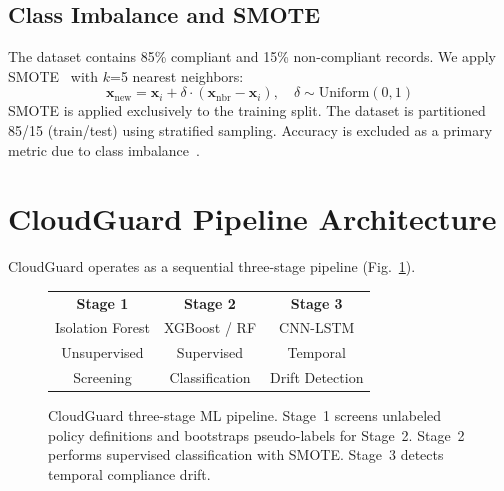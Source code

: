 \documentclass[conference]{IEEEtran}
\begin{document}
\subsection{Class Imbalance and SMOTE}
The dataset contains 85\% compliant and 15\% non-compliant records. 
We apply SMOTE~\cite{chawla2002} with $k$=5 nearest neighbors:
\begin{equation}
  \mathbf{x}_{\text{new}} = \mathbf{x}_i + 
  \delta \cdot (\mathbf{x}_{\text{nbr}} - \mathbf{x}_i), 
  \quad \delta \sim \text{Uniform}(0,1)
\end{equation}
SMOTE is applied exclusively to the training split. The dataset is 
partitioned 85/15 (train/test) using stratified sampling. 
Accuracy is excluded as a primary metric due to class 
imbalance~\cite{sokolova2009}.

\section{CloudGuard Pipeline Architecture}

CloudGuard operates as a sequential three-stage pipeline (Fig.~\ref{fig:pipeline}).


\begin{figure}[htbp]
\centering
\small
\begin{tabular}{|c|c|c|}
\hline
\textbf{Stage 1} & \textbf{Stage 2} & \textbf{Stage 3} \\
Isolation Forest & XGBoost / RF & CNN-LSTM \\
Unsupervised & Supervised & Temporal \\
Screening & Classification & Drift Detection \\
\hline
\end{tabular}
\caption{CloudGuard three-stage ML pipeline. Stage~1 screens unlabeled 
policy definitions and bootstraps pseudo-labels for Stage~2. Stage~2 
performs supervised classification with SMOTE. Stage~3 detects 
temporal compliance drift.}
\label{fig:pipeline}
\end{figure}
\end{document}
